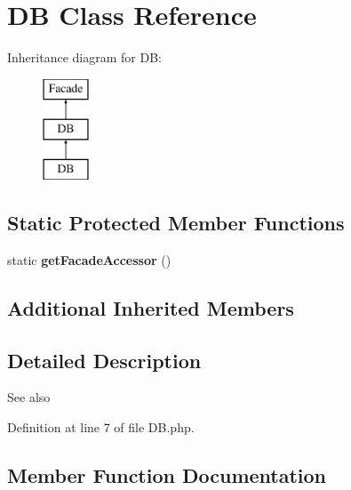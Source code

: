 \section{D\+B Class Reference}
\label{class_illuminate_1_1_support_1_1_facades_1_1_d_b}
Inheritance diagram for D\+B\+:\begin{figure}[H]
\begin{center}
\leavevmode
\includegraphics[height=3.000000cm]{class_illuminate_1_1_support_1_1_facades_1_1_d_b}
\end{center}
\end{figure}
\subsection*{Static Protected Member Functions}
\begin{DoxyCompactItemize}
\item 
static {\bf get\+Facade\+Accessor} ()
\end{DoxyCompactItemize}
\subsection*{Additional Inherited Members}


\subsection{Detailed Description}
\begin{DoxySeeAlso}{See also}



\end{DoxySeeAlso}


Definition at line 7 of file D\+B.\+php.



\subsection{Member Function Documentation}
